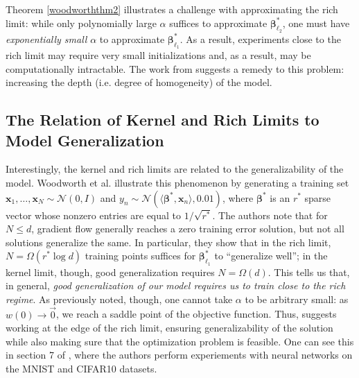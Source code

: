 \documentclass{article}
\begin{document}
Theorem \ref{woodworththm2} illustrates a challenge with approximating the rich limit: while only polynomially large $\alpha$ suffices to approximate $\boldsymbol{\beta}_{\ell_2}^*$, one must have \textit{exponentially small} $\alpha$ to approximate $\boldsymbol{\beta}_{\ell_1}^*$. As a result, experiments close to the rich limit may require very small initializations and, as a result, may be computationally intractable. The work from \cite{arora2019implicit} suggests a remedy to this problem: increasing the depth (i.e. degree of homogeneity) of the model. 

\subsection{The Relation of Kernel and Rich Limits to Model Generalization}
Interestingly, the kernel and rich limits are related to the generalizability of the model. Woodworth et al. illustrate this phenomenon by generating a training set $\boldsymbol{x}_1, \ldots, \boldsymbol{x}_N \sim \mathcal{N}(0, I)$ and $y_n \sim \mathcal{N}(\langle \boldsymbol{\beta}^*, \boldsymbol{x}_n \rangle, 0.01)$, where $\boldsymbol{\beta}^*$ is an $r^*$ sparse vector whose nonzero entries are equal to $1/\sqrt{r^*}$. The authors note that for $N \leq d$, gradient flow generally reaches a zero training error solution, but not all solutions generalize the same. In particular, they show that in the rich limit, $N = \Omega(r^*\log d)$ training points suffices for $\boldsymbol{\beta}_{\ell_1}^*$ to \enquote{generalize well}; in the kernel limit, though, good generalization requires $N = \Omega(d)$. This tells us that, in general, \textit{good generalization of our model requires us to train close to the rich regime}. As previously noted, though, one cannot take $\alpha$ to be arbitrary small: as $w(0) \rightarrow \vec{0}$, we reach a saddle point of the objective function. Thus, \cite{woodworth2020kernel} suggests working at the edge of the rich limit, ensuring generalizability of the solution while also making sure that the optimization problem is feasible. One can see this in section 7 of \cite{woodworth2020kernel}, where the authors perform experiements with neural networks on the MNIST and CIFAR10 datasets.
\end{document}
